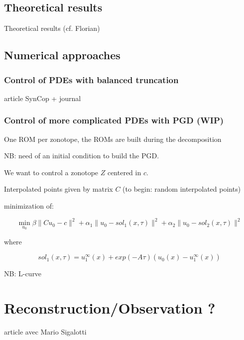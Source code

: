 \documentclass[a4paper,10pt]{article}
\begin{document}
\subsection{Theoretical results}
Theoretical results (cf. Florian)


\subsection{Numerical approaches}
\subsubsection{Control of PDEs with balanced truncation}
article SynCop + journal 


\subsubsection{Control of more complicated PDEs with PGD (WIP)}

One ROM per zonotope, the ROMs are built during the decomposition

NB: need of an initial condition to build the PGD.

We want to control a zonotope $Z$ centered in $c$. 

Interpolated points given by matrix $C$ (to begin: random interpolated points)


minimization of: 


\begin{equation}
 \min_{u_0} \beta \| C u_0 - c \|^2 + \alpha_1 \| u_0 - sol_1(x,\tau) \|^2 + \alpha_2 \| u_0 - sol_2(x,\tau) \|^2
\end{equation}

where 


\begin{equation}
 sol_1(x, \tau) = u_1^\infty (x) + exp(-A \tau) ( u_0(x) - u_1^\infty(x))
\end{equation}

NB: L-curve


\section{Reconstruction/Observation ?}
article avec Mario Sigalotti 
\end{document}

